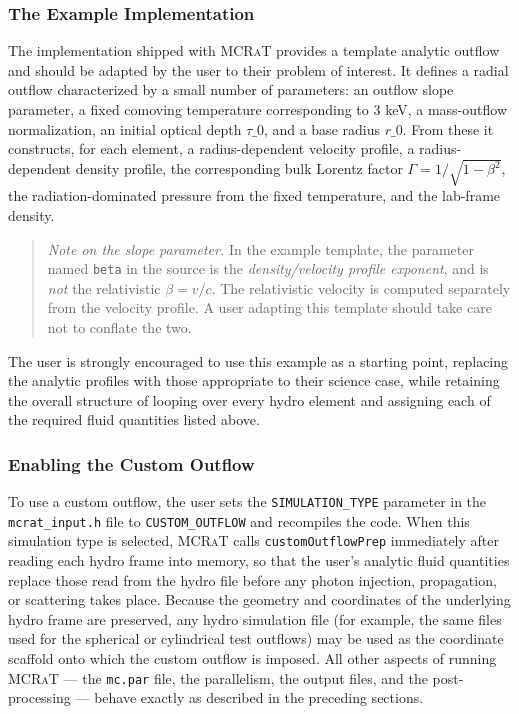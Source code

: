 \documentclass[12pt,a4paper]{article}
\newcommand{\mcrat}{\textsc{MCRaT}}
\begin{document}
\subsubsection{The Example Implementation}
The implementation shipped with \mcrat{} provides a template analytic outflow and should be adapted by the user to their problem of interest. It defines a radial outflow characterized by a small number of parameters: an outflow slope parameter, a fixed comoving temperature corresponding to 3 keV, a mass-outflow normalization, an initial optical depth $\tau\_0$, and a base radius $r\_0$. From these it constructs, for each element, a radius-dependent velocity profile, a radius-dependent density profile, the corresponding bulk Lorentz factor $\Gamma=1/\sqrt{1-\beta^2}$, the radiation-dominated pressure from the fixed temperature, and the lab-frame density.\begin{quotation}
	\noindent \emph{Note on the slope parameter.} In the example template, the parameter named \texttt{beta} in the source is the \emph{density/velocity profile exponent}, and is \emph{not} the relativistic $\beta=v/c$. The relativistic velocity is computed separately from the velocity profile. A user adapting this template should take care not to conflate the two.
\end{quotation}The user is strongly encouraged to use this example as a starting point, replacing the analytic profiles with those appropriate to their science case, while retaining the overall structure of looping over every hydro element and assigning each of the required fluid quantities listed above.\subsubsection{Enabling the Custom Outflow}
To use a custom outflow, the user sets the \texttt{SIMULATION\_TYPE} parameter in the \texttt{mcrat\_input.h} file to \texttt{CUSTOM\_OUTFLOW} and recompiles the code. When this simulation type is selected, \mcrat{} calls \texttt{customOutflowPrep} immediately after reading each hydro frame into memory, so that the user's analytic fluid quantities replace those read from the hydro file before any photon injection, propagation, or scattering takes place. Because the geometry and coordinates of the underlying hydro frame are preserved, any hydro simulation file (for example, the same files used for the spherical or cylindrical test outflows) may be used as the coordinate scaffold onto which the custom outflow is imposed. All other aspects of running \mcrat{} --- the \texttt{mc.par} file, the parallelism, the output files, and the post-processing --- behave exactly as described in the preceding sections.



\end{document}
